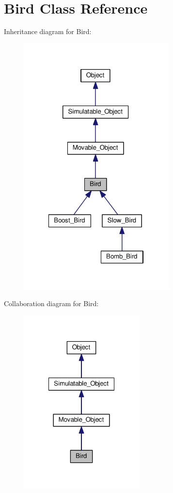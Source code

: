 \hypertarget{classBird}{\section{Bird Class Reference}
\label{classBird}
}


Inheritance diagram for Bird\+:\nopagebreak
\begin{figure}[H]
\begin{center}
\leavevmode
\includegraphics[width=226pt]{classBird__inherit__graph}
\end{center}
\end{figure}


Collaboration diagram for Bird\+:\nopagebreak
\begin{figure}[H]
\begin{center}
\leavevmode
\includegraphics[width=180pt]{classBird__coll__graph}
\end{center}
\end{figure}

